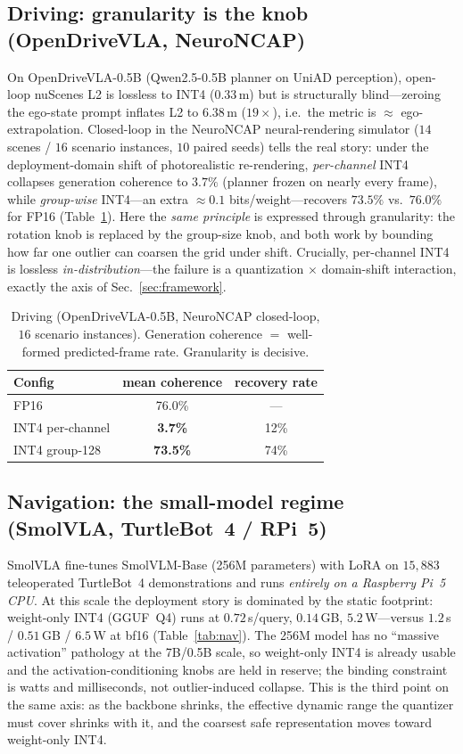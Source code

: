 \documentclass[11pt]{article}
\begin{document}
\subsection{Driving: granularity is the knob (OpenDriveVLA, NeuroNCAP)}
On OpenDriveVLA-0.5B (Qwen2.5-0.5B planner on UniAD perception), open-loop nuScenes L2 is lossless
to INT4 ($0.33$\,m) but is structurally blind---zeroing the ego-state prompt inflates L2 to
$6.38$\,m ($19\times$), i.e.\ the metric is $\approx$ ego-extrapolation. Closed-loop in the NeuroNCAP
neural-rendering simulator ($14$ scenes / $16$ scenario instances, $10$ paired seeds) tells the real
story: under the deployment-domain shift of photorealistic re-rendering, \emph{per-channel} INT4
collapses generation coherence to $3.7\%$ (planner frozen on nearly every frame), while
\emph{group-wise} INT4---an extra $\approx0.1$ bits/weight---recovers $73.5\%$ vs.\ $76.0\%$ for FP16
(Table~\ref{tab:drive}). Here the \emph{same principle} is expressed through granularity: the rotation
knob is replaced by the group-size knob, and both work by bounding how far one outlier can coarsen the
grid under shift. Crucially, per-channel INT4 is lossless \emph{in-distribution}---the failure is a
quantization$\,\times\,$domain-shift interaction, exactly the axis of Sec.~\ref{sec:framework}.

\begin{table}[h]\centering
\caption{Driving (OpenDriveVLA-0.5B, NeuroNCAP closed-loop, $16$ scenario instances). Generation
coherence $=$ well-formed predicted-frame rate. Granularity is decisive.}
\label{tab:drive}
\begin{tabular}{lcc}
\toprule
Config & mean coherence & recovery rate \\
\midrule
FP16 & 76.0\% & --- \\
INT4 per-channel & \textbf{3.7\%} & 12\% \\
INT4 group-128 & \textbf{73.5\%} & 74\% \\
\bottomrule
\end{tabular}
\end{table}

\subsection{Navigation: the small-model regime (SmolVLA, TurtleBot~4 / RPi~5)}
SmolVLA fine-tunes SmolVLM-Base (256M parameters) with LoRA on $15{,}883$ teleoperated TurtleBot~4
demonstrations and runs \emph{entirely on a Raspberry Pi~5 CPU}. At this scale the deployment story
is dominated by the static footprint: weight-only INT4 (GGUF~Q4) runs at $0.72$\,s/query, $0.14$\,GB,
$5.2$\,W---versus $1.2$\,s / $0.51$\,GB / $6.5$\,W at bf16 (Table~\ref{tab:nav}). The 256M model has
no ``massive activation'' pathology at the 7B/0.5B scale, so weight-only INT4 is already usable and
the activation-conditioning knobs are held in reserve; the binding constraint is watts and
milliseconds, not outlier-induced collapse. This is the third point on the same axis: as the backbone
shrinks, the effective dynamic range the quantizer must cover shrinks with it, and the coarsest safe
representation moves toward weight-only INT4.
\end{document}
